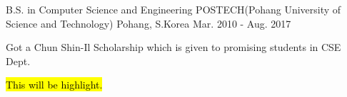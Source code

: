 

\begin{cventries}

  \cventry
    {B.S. in Computer Science and Engineering} %
    {POSTECH(Pohang University of Science and Technology)} %
    {Pohang, S.Korea} %
    {Mar. 2010 - Aug. 2017} %
    {
      \begin{cvitems} %
        \item {Got a Chun Shin-Il Scholarship which is given to promising students in CSE Dept.}
      \end{cvitems}
    }
\hl{This will be highlight.}

\end{cventries}

